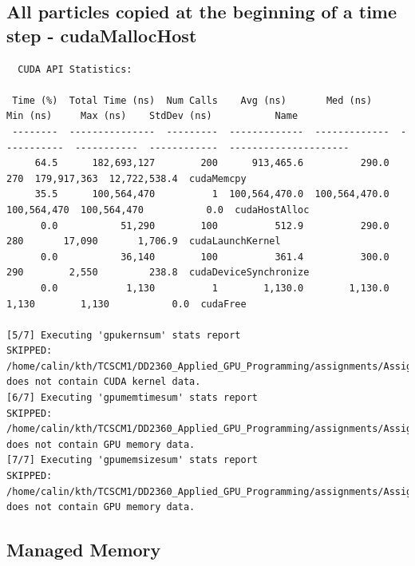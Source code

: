 \documentclass[english]{exam}
\begin{document}
\subsection*{All particles copied at the beginning of a time step - cudaMallocHost}

\begin{lstlisting}
  CUDA API Statistics:

 Time (%)  Total Time (ns)  Num Calls    Avg (ns)       Med (ns)      Min (ns)     Max (ns)    StdDev (ns)           Name         
 --------  ---------------  ---------  -------------  -------------  -----------  -----------  ------------  ---------------------
     64.5      182,693,127        200      913,465.6          290.0          270  179,917,363  12,722,538.4  cudaMemcpy           
     35.5      100,564,470          1  100,564,470.0  100,564,470.0  100,564,470  100,564,470           0.0  cudaHostAlloc        
      0.0           51,290        100          512.9          290.0          280       17,090       1,706.9  cudaLaunchKernel     
      0.0           36,140        100          361.4          300.0          290        2,550         238.8  cudaDeviceSynchronize
      0.0            1,130          1        1,130.0        1,130.0        1,130        1,130           0.0  cudaFree             

[5/7] Executing 'gpukernsum' stats report
SKIPPED: /home/calin/kth/TCSCM1/DD2360_Applied_GPU_Programming/assignments/Assignment_3/ex_2/my_report.sqlite
does not contain CUDA kernel data.
[6/7] Executing 'gpumemtimesum' stats report
SKIPPED: /home/calin/kth/TCSCM1/DD2360_Applied_GPU_Programming/assignments/Assignment_3/ex_2/my_report.sqlite
does not contain GPU memory data.
[7/7] Executing 'gpumemsizesum' stats report
SKIPPED: /home/calin/kth/TCSCM1/DD2360_Applied_GPU_Programming/assignments/Assignment_3/ex_2/my_report.sqlite
does not contain GPU memory data.

\end{lstlisting}
\clearpage
\subsection*{Managed Memory}
\end{document}
